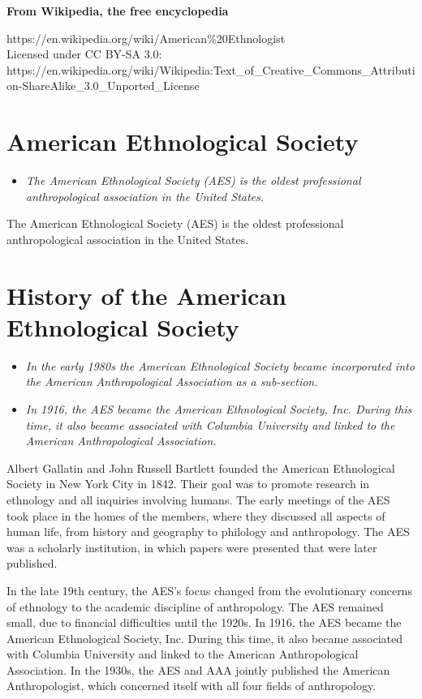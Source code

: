 \textbf{From Wikipedia, the free encyclopedia}

https://en.wikipedia.org/wiki/American\%20Ethnologist\\
Licensed under CC BY-SA 3.0:\\
https://en.wikipedia.org/wiki/Wikipedia:Text\_of\_Creative\_Commons\_Attribution-ShareAlike\_3.0\_Unported\_License

\section{American Ethnological
Society}\label{american-ethnological-society}

\begin{itemize}
\item
  \emph{The American Ethnological Society (AES) is the oldest
  professional anthropological association in the United States.}
\end{itemize}

The American Ethnological Society (AES) is the oldest professional
anthropological association in the United States.

\section{History of the American Ethnological
Society}\label{history-of-the-american-ethnological-society}

\begin{itemize}
\item
  \emph{In the early 1980s the American Ethnological Society became
  incorporated into the American Anthropological Association as a
  sub-section.}
\item
  \emph{In 1916, the AES became the American Ethnological Society, Inc.
  During this time, it also became associated with Columbia University
  and linked to the American Anthropological Association.}
\end{itemize}

Albert Gallatin and John Russell Bartlett founded the American
Ethnological Society in New York City in 1842. Their goal was to promote
research in ethnology and all inquiries involving humans. The early
meetings of the AES took place in the homes of the members, where they
discussed all aspects of human life, from history and geography to
philology and anthropology. The AES was a scholarly institution, in
which papers were presented that were later published.

In the late 19th century, the AES's focus changed from the evolutionary
concerns of ethnology to the academic discipline of anthropology. The
AES remained small, due to financial difficulties until the 1920s. In
1916, the AES became the American Ethnological Society, Inc. During this
time, it also became associated with Columbia University and linked to
the American Anthropological Association. In the 1930s, the AES and AAA
jointly published the American Anthropologist, which concerned itself
with all four fields of anthropology.


